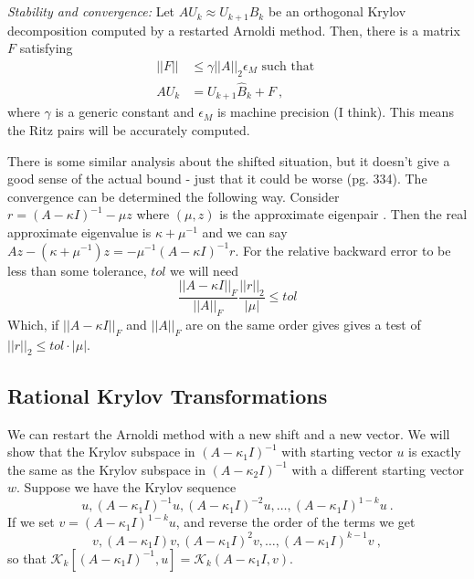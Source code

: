 \documentclass[12pt,twoside]{article}
\newcommand{\eval}{eigenvalue }
\newcommand{\cl}[1]{\ensuremath{\mathcal{#1}}}
\newcommand{\epair}{eigenpair }
\begin{document}
\emph{Stability and convergence:} Let $AU_{k} \approx U_{k+1}\hat{B}_{k}$ be an orthogonal Krylov decomposition computed by a restarted Arnoldi method. Then, there is a matrix $F$ satisfying 
\begin{align}
  ||F|| &\le \gamma ||A||_{2}\epsilon_{M} \text{ such that } \\
  AU_{k} &= U_{k+1}\hat{B}_{k} + F \:,
\end{align}
where $\gamma$ is a generic constant and $\epsilon_{M}$ is machine precision (I think). This means the Ritz pairs will be accurately computed. 

There is some similar analysis about the shifted situation, but it doesn't give a good sense of the actual bound - just that it could be worse (pg. 334). The convergence can be determined the following way. Consider $r = (A - \kappa I)^{-1} - \mu z$ where $(\mu, z)$ is the approximate \epair. Then the real approximate \eval is $\kappa + \mu^{-1}$ and we can say $Az - (\kappa + \mu^{-1})z = -\mu^{-1}(A - \kappa I)^{-1}r$. For the relative backward error to be less than some tolerance, $tol$ we will need
\begin{equation}
  \frac{||A - \kappa I||_{F}}{||A||_{F}} \frac{||r||_{2}}{|\mu|} \le tol
\end{equation}
Which, if $||A - \kappa I||_{F}$ and $||A||_{F}$ are on the same order gives gives a test of $||r||_{2} \le tol \cdot |\mu|$. 

\subsection{Rational Krylov Transformations}
We can restart the Arnoldi method with a new shift and a new vector. We will show that the Krylov subspace in $(A - \kappa_{1}I)^{-1}$ with starting vector $u$ is exactly the same as the Krylov subspace in $(A - \kappa_{2}I)^{-1}$ with a different starting vector $w$. Suppose we have the Krylov sequence
\begin{equation}
 u, (A - \kappa_{1}I)^{-1}u, (A - \kappa_{1}I)^{-2}u, \dots , (A - \kappa_{1}I)^{1-k}u \:. 
\end{equation}
If we set $v = (A - \kappa_{1}I)^{1-k}u$, and reverse the order of the terms we get
\begin{equation}
 v, (A - \kappa_{1}I)v, (A - \kappa_{1}I)^{2}v, \dots , (A - \kappa_{1}I)^{k-1}v \:, 
\end{equation}
so that $\cl{K}_{k}[(A - \kappa_{1}I)^{-1}, u] = \cl{K}_{k}(A - \kappa_{1}I, v)$. 
\end{document}
